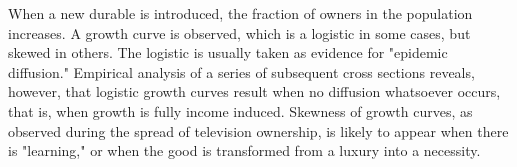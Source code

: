 When a new durable is introduced, the fraction of owners in the population increases. A growth curve is observed, which is a logistic in some cases, but skewed in others. The logistic is usually taken as evidence for "epidemic diffusion." Empirical analysis of a series of subsequent cross sections reveals, however, that logistic growth curves result when no diffusion whatsoever occurs, that is, when growth is fully income induced. Skewness of growth curves, as observed during the spread of television ownership, is likely to appear when there is "learning," or when the good is transformed from a luxury into a necessity.
